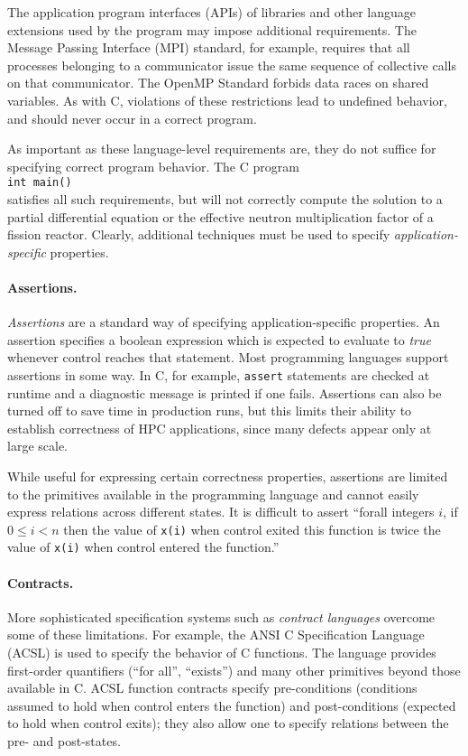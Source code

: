 The application program interfaces (APIs) of libraries and other language extensions used by the program may impose additional requirements.  The Message Passing Interface (MPI) standard, for example, requires that all processes belonging to a communicator issue the same sequence of collective calls on that communicator.  The OpenMP Standard forbids data races on shared variables.  As with C, violations of these restrictions lead to undefined behavior, and should never occur in a correct program.

As important as these language-level requirements are, they do not suffice for specifying correct program behavior.  The C program\\
\phantom{xxx}\texttt{int\ main()\ \lb\rb}\\
satisfies all such requirements, but will not correctly compute the solution to a partial differential equation or the effective neutron multiplication factor of a fission reactor.  Clearly, additional techniques must be used to specify \emph{application-specific} properties.

\paragraph{Assertions.}  \emph{Assertions} are a standard way of specifying application\--spe\-ci\-fic properties.   An assertion specifies a boolean expression which is expected to evaluate to \emph{true} whenever control reaches that statement.  Most programming languages support assertions in some way.  In C, for example, \texttt{assert} statements are checked at runtime and a diagnostic message is printed if one fails.  Assertions can also be turned off to save time in production runs, but this limits their ability to establish correctness of HPC applications, since many defects appear only at large scale.

While useful for expressing certain correctness properties, assertions are limited to the primitives available in the programming language and cannot easily express relations across different states.  It is difficult to assert ``forall integers $i$, if $0\leq i<n$ then the value of \texttt{x(i)} when control exited this function is twice the value of \texttt{x(i)} when control entered the function.''

\paragraph{Contracts.}  More sophisticated specification systems such as \emph{contract languages} overcome some of these limitations.  For example, the ANSI C Specification Language (ACSL) is used to specify the behavior of C functions.  The language provides first-order quantifiers (``for all'', ``exists'') and many other primitives beyond those available in C.   ACSL function contracts specify pre-conditions (conditions assumed to hold when control enters the function) and post-conditions (expected to hold when control exits); they also allow one to specify relations between the pre- and post-states.

